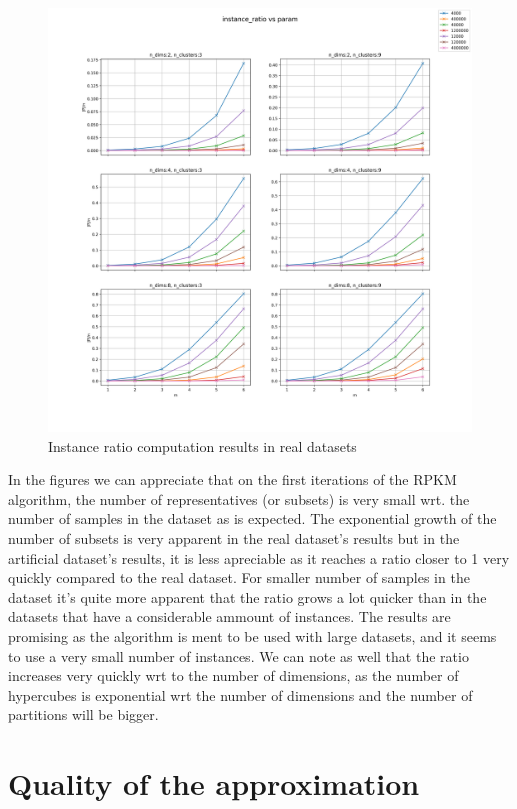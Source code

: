 \begin{figure}[!ht]
    \includegraphics[width=\linewidth]{images/experiments/instance_ratio_real.png}
    \caption{Instance ratio computation results in real datasets}
    \label{fig:instance_real}
\end{figure}

In the figures we can appreciate that on the first iterations of the RPKM algorithm, the number of representatives (or subsets) is very small wrt. the number of samples in the dataset as is expected. The exponential growth of the number of subsets is very apparent in the real dataset's results but in the artificial dataset's results, it is less apreciable as it reaches a ratio closer to 1 very quickly compared to the real dataset. For smaller number of samples in the dataset it's quite more apparent that the ratio grows a lot quicker than in the datasets that have a considerable ammount of instances. The results are promising as the algorithm is ment to be used with large datasets, and it seems to use a very small number of instances. We can note as well that the ratio increases very quickly wrt to the number of dimensions, as the number of hypercubes is exponential wrt the number of dimensions and the number of partitions will be bigger.

\section{Quality of the approximation}

